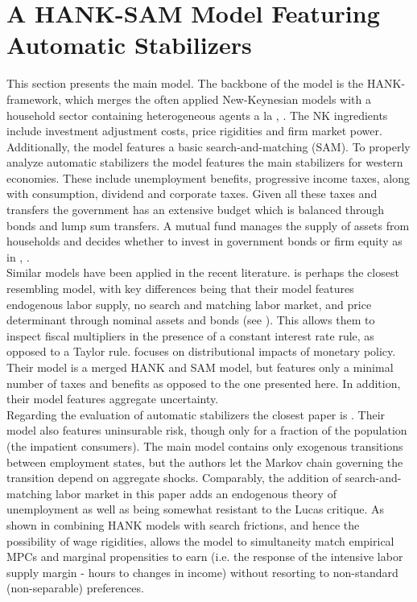 



\section{A HANK-SAM Model Featuring Automatic Stabilizers} \label{chap:Model1}
This section presents the main model. The backbone of the model is the HANK-framework, which merges the often applied New-Keynesian models with a household sector containing heterogeneous agents a la \citet{aiyagari1994uninsured}, \citet{krusell1998income}. The NK ingredients include investment adjustment costs, price rigidities and firm market power. Additionally, the model features a basic search-and-matching (SAM). 
To properly analyze automatic stabilizers the model features the main stabilizers for western economies. These include unemployment benefits, progressive income taxes, along with consumption, dividend and corporate taxes. Given all these taxes and transfers the government has an extensive budget which is balanced through bonds and lump sum transfers. A mutual fund manages the supply of assets from households and decides whether to invest in government bonds or firm equity as in  \citet{gornemann2016doves}, \citet{auclert2020micro}.     \\
Similar models have been applied in the recent literature. \citet{hagedorn2019fiscal} is perhaps the closest resembling model, with key differences being that their model features endogenous labor supply, no search and matching labor market, and price determinant through nominal assets and bonds (see \citet{hagedorn2018prices}). This allows them to inspect fiscal multipliers in the presence of a constant interest rate rule, as opposed to a Taylor rule. 
\citet{gornemann2016doves} focuses on distributional impacts of monetary policy. Their model is a merged HANK and SAM model, but features only a minimal number of taxes and benefits as opposed to the one presented here. In addition, their model features aggregate uncertainty. \\
Regarding the evaluation of automatic stabilizers the closest paper is \citet{mckay2016role}. Their model also features uninsurable risk, though only for a fraction of the population (the impatient consumers). The main model contains only exogenous transitions between employment states, but the authors let the Markov chain governing the transition depend on aggregate shocks. Comparably, the addition of search-and-matching labor market in this paper adds an endogenous theory of unemployment as well as being somewhat resistant to the Lucas critique. 
As shown in \citet{auclert2020mpcs} combining HANK models with search frictions, and hence the possibility of wage rigidities, allows the model to simultaneity match empirical MPCs and marginal propensities to earn (i.e. the response of the intensive labor supply margin - hours to changes in income) without resorting to non-standard (non-separable) preferences.  



